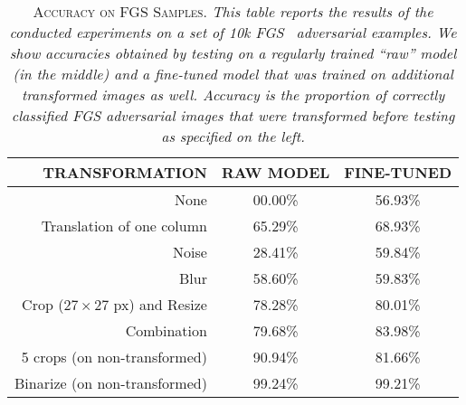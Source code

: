 \documentclass[conference]{IEEEtran}
\renewcommand\cap[3]{\caption[#2]{\label{#1}\textsc{#2}. \small\textit{#3}}}
\begin{document}
\begin{table}[t]
\footnotesize
\centering
\begin{tabular}{r|c|c}
\toprule
TRANSFORMATION              				& RAW MODEL	& FINE-TUNED\\ \midrule \midrule
None                        				& 00.00\%  	& 56.93\%\\
Translation of one column   				& 65.29\%	& 68.93\%\\
Noise                       				& 28.41\%	& 59.84\%\\
Blur                        				& 58.60\%  	& 59.83\%\\
Crop (27\,$\times$\,27 px) and Resize  	& 78.28\%	& 80.01\%\\
Combination								& 79.68\%	& 83.98\%\\ \midrule 
5 crops (on non-transformed)    			& 90.94\% 	& 81.66\%\\
Binarize (on non-transformed)   			& 99.24\% 	& 99.21\%\\
\bottomrule
\end{tabular}
\cap{table:fgs}{Accuracy on FGS Samples}{This table reports the results of the conducted experiments on a set of 10k FGS~\cite{c5} adversarial examples. We show accuracies obtained by testing on a regularly trained ``raw'' model (in the middle) and a fine-tuned model that was trained on additional transformed images as well. Accuracy is the proportion of correctly classified FGS adversarial images that were transformed before testing as specified on the left.}
\end{table}
\end{document}
